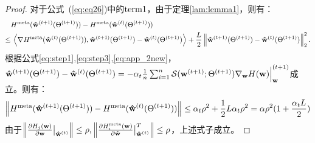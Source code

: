 \begin{proof}
对于公式~(\ref{eq:eq26})中的${\rm term 1}$，由于定理\ref{lam:lemma1}，则有：
\begin{equation}
    \begin{aligned}
        & H^{\rm meta}(\mathbf{\hat w}^{(t+1)}(\Theta^{(t+1)})) - 
    H^{\rm meta}(\mathbf{\hat w}^{(t)}(\Theta^{(t+1)})) \\
    \leq & \, 
    \left \langle  
    \nabla H^{\rm meta}(\mathbf{\hat w}^{(t)}(\Theta^{(t+1)})), \mathbf{\hat w}^{(t+1)}(\Theta^{(t+1)}) - \mathbf{\hat w}^{(t)}(\Theta^{(t+1)}) \right \rangle + \frac{L}{2}
    \left \|  
     \mathbf{\hat w}^{(t+1)}(\Theta^{(t+1)}) - \mathbf{\hat w}^{(t)}(\Theta^{(t+1)})
    \right \|_2^2.
    \end{aligned}
\end{equation}
根据公式\ref{eq:step1},\ref{eq:step3},\ref{eq:app_2new}，$\mathbf{\hat w}^{(t+1)}(\Theta^{(t+1)}) - \mathbf{\hat w}^{(t)}(\Theta^{(t+1)}) = -\alpha_t \frac{1}{n}\sum\nolimits_{i=1}^n \mathcal{S}(\mathbf{w}^{(t+1)}; \Theta^{(t+1)}) \nabla_{\mathbf{w}} H(\mathbf{w}) \Big{|}_\mathbf{w}^{(t+1)}$成立。则有：
\begin{equation}
\label{eq:term1}
    \left\|
     H^{\rm meta}(\mathbf{\hat w}^{(t+1)}(\Theta^{(t+1)})) - 
    H^{\rm meta}(\mathbf{\hat w}^{(t)}(\Theta^{(t +1 )}))    \right\|
    \leq \alpha_t \rho^2 + \frac{1}{2} L \alpha_t \rho^2
    = \alpha \rho^2 (1 + \frac{\alpha_t L}{2})
\end{equation}
由于$\left\| \frac{\partial H_j(\mathbf{w})}{\partial \mathbf{w}} \big{|}_{\mathbf{\hat w}^{(t)}}\right\| \leq \rho, 
\left\| \frac{\partial H_i^{\rm meta}(\mathbf{w})}{\partial \mathbf{\hat w}} \big{|}_{\mathbf{\hat w}^{(t)}}^T \right\| \leq \rho$，上述式子成立。



\end{proof}
